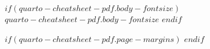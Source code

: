 \setcounter{colnum}{1}
\newlength{\colheight}
\setlength{\colheight}{0pt}

$if(quarto-cheatsheet-pdf.body-fontsize)$
$quarto-cheatsheet-pdf.body-fontsize$
$endif$

$if(quarto-cheatsheet-pdf.page-margins)$
\geometry{$quarto-cheatsheet-pdf.page-margins$}
$endif$
